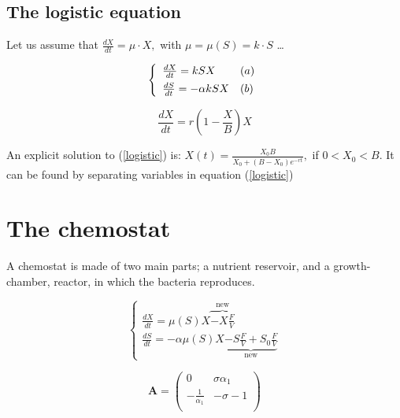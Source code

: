 \documentclass[a4paper, 10pt, twoside, openright]{book}
\begin{document}
\subsection{The logistic equation}

Let us assume that $\frac{dX}{dt}=\mu \cdot X,$ with
$\mu=\mu(S)=k\cdot S$ \ldots 

\begin{displaymath}
\left\{ \begin{array}{ll}
\frac{dX}{dt}=kSX                            & (a) \\
\frac{dS}{dt}=- \alpha kSX \rule{0pt}{3ex}   & (b) 
\end{array}\right.
\end{displaymath}

\begin{equation} \label{logistic}
\frac{dX}{dt}= r(1- \frac{X}{B})X  
\end{equation}

An explicit solution to (\ref{logistic}) is: 
$X(t)=\frac{{X}_{0}B}{{X}_{0}+(B-{X}_{0}){e}^{-rt}},$ if $0<{X}_{0}<B$. 
It can be found by separating variables in equation (\ref{logistic})


\section{The chemostat} 

A chemostat is made of two main parts; a nutrient reservoir, and a
growth-chamber, reactor, in which the bacteria reproduces. 

\begin{equation} \label{chemo_basic}
\left\{ \begin{array}{l}
\frac{dX}{dt}= \mu(S)X \overbrace{-X\frac{F}{V}}^{\textrm{new}}  \\
\frac{dS}{dt}=- \alpha \mu(S) X
\underbrace{-S\frac{F}{V}+ {S}_{0}\frac{F}{V}}_{\textrm{new}} 
\end{array}\right.
\end{equation}

\begin{displaymath}
\mathbf{A} =
\left( \begin{array}{cc}
0 &  \sigma {\alpha}_{1}  \\
 - \frac{1}{{\alpha}_{1}} & -\sigma - 1 \\
\end{array}\right)
\end{displaymath}
\end{document}

